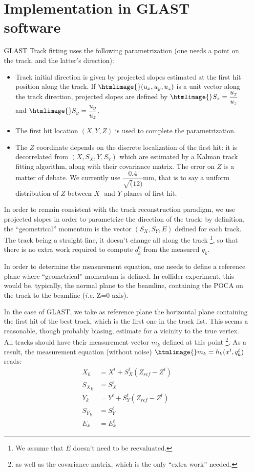\documentclass[12pt,final]{article}
\begin{document}
\section{Implementation in GLAST software }

GLAST Track fitting uses the following parametrization (one needs a point on the track, and the latter's direction):
\begin{itemize}
\item Track initial direction is given by projected slopes estimated at the first hit position along the track.
If $\htmlimage{}(u_x,u_y,u_z)$ is a unit vector along the track direction, projected slopes are defined by 
$\htmlimage{}\displaystyle{S_x=\frac{u_x}{u_z}}$ and  $\htmlimage{}\displaystyle{S_y=\frac{u_y}{u_z}}$.
\item The first hit location $(X,Y,Z)$ is used to complete the parametrization.
\item The $Z$ coordinate depends on the discrete localization of the first hit: it is decorrelated from 
$(X,S_X,Y,S_Y)$ which are estimated by a Kalman track fitting algorithm, along with their covariance matrix. 
The error on $Z$ is a matter of debate. We currently use $\dfrac{0.4}{\sqrt(12)}$mm, that is to say a uniform 
distribution of $Z$ between $X$- and $Y$-planes of first hit.
\end{itemize}

In order to remain consistent with the track reconstruction paradigm, we use projected slopes in order to
parametrize the direction of the track: by definition, the ``geometrical'' momentum is the vector $(S_X,S_Y,E)$ 
defined for each track.
The track being a straight line, it doesn't change all along the track
\footnote{We assume that $E$ doesn't need to be reevaluated.}, so that there is no extra work required to
compute $q^0_k$ from the measured $q_k$.

In order to determine the measurement equation, one needs to define a reference plane where ``geometrical'' 
momentum is defined. In collider experiment, this would be, typically, the normal plane to the beamline, 
containing the POCA on the track to the beamline ({\it i.e.} Z=0 axis).
 
In the case of GLAST, we take as reference plane the horizontal plane containing the first hit of
the best track, which is the first one in the track list. 
This seems a reasonable, though probably biasing, estimate for a vicinity to the true vertex.
All tracks should have their measurement vector $m_k$ defined at this point
\footnote{as well as the covariance matrix, which is the only ``extra work'' needed.}.
As a result, the measurement equation (without noise) $\htmlimage{}m_k = h_k(x^t,q^t_k)$ reads:
\begin{equation}
\begin{aligned}
X_k      &= X^t + S^t_{X}(Z_{ref} - Z^t)\\
{S_X}_k  &= S^t_X\\
Y_k      &= Y^t + S^t_Y(Z_{ref} - Z^t)\\
{S_Y}_k  &= S^t_Y\\
E_k      &= E^t_k
\end{aligned}
\end{equation}
\end{document}
